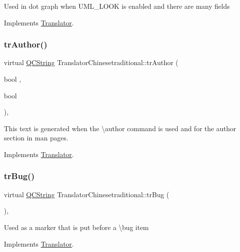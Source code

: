 Used in dot graph when U\+M\+L\+\_\+\+L\+O\+OK is enabled and there are many fields 

Implements \mbox{\hyperlink{class_translator}{Translator}}.

\mbox{\label{class_translator_chinesetraditional_ab96d9f905b0b31764eb86c3085a14520}} 
\subsubsection{\texorpdfstring{trAuthor()}{trAuthor()}}
{\footnotesize\ttfamily virtual \mbox{\hyperlink{class_q_c_string}{Q\+C\+String}} Translator\+Chinesetraditional\+::tr\+Author (\begin{DoxyParamCaption}\item[{bool}]{,  }\item[{bool}]{ }\end{DoxyParamCaption})\hspace{0.3cm}{\ttfamily [inline]}, {\ttfamily [virtual]}}

This text is generated when the \textbackslash{}author command is used and for the author section in man pages. 

Implements \mbox{\hyperlink{class_translator}{Translator}}.

\mbox{\label{class_translator_chinesetraditional_a5f09c2d99e71b0ecd441790b30c7f8fa}} 
\subsubsection{\texorpdfstring{trBug()}{trBug()}}
{\footnotesize\ttfamily virtual \mbox{\hyperlink{class_q_c_string}{Q\+C\+String}} Translator\+Chinesetraditional\+::tr\+Bug (\begin{DoxyParamCaption}{ }\end{DoxyParamCaption})\hspace{0.3cm}{\ttfamily [inline]}, {\ttfamily [virtual]}}

Used as a marker that is put before a \textbackslash{}bug item 

Implements \mbox{\hyperlink{class_translator}{Translator}}.

